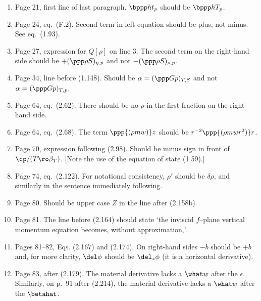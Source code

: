 \documentclass[10pt]{article}
\newcommand{\eq}{eq.\ } \newcommand{\Eq}{Eq.\ }
\begin{document}
\begin{enumerate}

\item Page 21, first line of last paragraph. $\bppp h t _p$ should be $\bppp hT_p$.

\item Page 24, \eq (F.2). Second term in left equation should be plus, not minus. See \eq (1.93).

\item Page 27, expression for $Q[\rho]$ on line 3. The second term on the right-hand side should be $+ (\ppp \rho S)_{\eta,p}$ and not $-(\ppp \rho S)_{\rho,p}$.

\item Page 34, line before (1.148). Should be $\alpha  = (\ppp G p)_{T,S}$ and not
$\alpha  = (\ppp G p)_{T,p}$.

\item Page 64, \eq (2.62). There should be no $\rho$ in the first fraction on the right-hand side.  

\item Page 64, \eq (2.68). The term $\ppp{(\rho m w)} z$ should be $r^{-2}\ppp{(\rho m w r^2)} r $.

\item Page 70, expression following (2.98). Should be minus sign in front of $\cp/(T 
\ro\beta_T)$. [Note the use of the equation of state (1.59).] 

\item Page 74, \eq (2.122). For notational consistency, $\rho'$ should be $\delta \rho$, and similarly in the sentence immediately following. 

\item Page 80. Should be upper case $Z$ in the line after (2.158b).

\item Page 81. The line before  (2.164) should state `the inviscid $f$--plane vertical momentum equation becomes, without approximation,'.


\item Pages 81--82, Eqs. (2.167) and (2.174). On right-hand sides $-b$ should be $+b$ and, for more clarity, $\del \phi$ should be $\del_z\phi$ (it is a horizontal derivative).

\item Page 83, after (2.179). The material derivative lacks a $\what w$ after the $\epsilon$. Similarly, on p.\ 91 after (2.214), the material derivative lacks a $\what w$ after the $\betahat$.


\end{enumerate}
\end{document}
